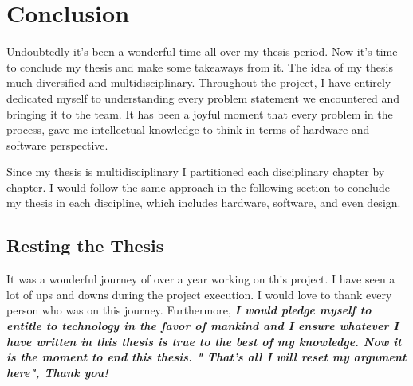 \chapter*{Conclusion}
Undoubtedly it's been a wonderful time all over my thesis period. Now it's time to conclude my thesis and make some takeaways from it. The idea of my thesis much diversified and multidisciplinary. Throughout the project, I have entirely dedicated myself to understanding every problem statement we encountered and bringing it to the team. It has been a joyful moment that every problem in the process, gave me intellectual knowledge to think in terms of hardware and software perspective.

Since my thesis is multidisciplinary I partitioned each disciplinary chapter by chapter. I would follow the same approach in the following section to conclude my thesis in each discipline, which includes hardware, software, and even design.







\section*{Resting the Thesis}

It was a wonderful journey of over a year working on this project. I have seen a lot of ups and downs during the project execution. I would love to thank every person who was on this journey. Furthermore, \textbf{ \textit{I would pledge myself to entitle to technology in the favor of mankind and I ensure whatever I have written in this thesis is true to the best of my knowledge. Now it is the moment to end this thesis. " That's all I will reset my argument here", Thank you!}}